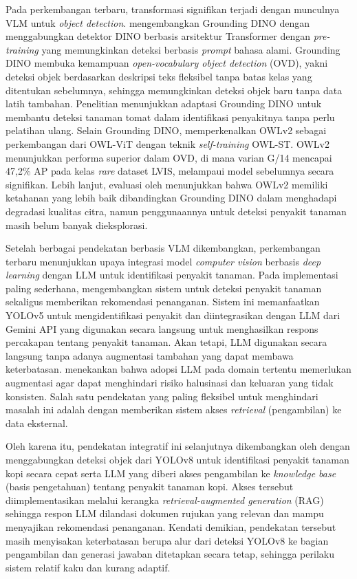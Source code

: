 Pada perkembangan terbaru, transformasi signifikan terjadi dengan munculnya VLM untuk \textit{object detection}. \textcite{liuGroundingDINOMarrying2025} mengembangkan Grounding DINO dengan menggabungkan detektor DINO berbasis arsitektur Transformer dengan \textit{pre-training} yang memungkinkan deteksi berbasis \textit{prompt} bahasa alami. Grounding DINO membuka kemampuan \textit{open-vocabulary object detection} (OVD), yakni deteksi objek berdasarkan deskripsi teks fleksibel tanpa batas kelas yang ditentukan sebelumnya, sehingga memungkinkan deteksi objek baru tanpa data latih tambahan. Penelitian \textcite{kaurVisuallanguageTransformerbasedTomato2025} menunjukkan adaptasi Grounding DINO untuk membantu deteksi tanaman tomat dalam identifikasi penyakitnya tanpa perlu pelatihan ulang. Selain Grounding DINO, \textcite{mindererScalingOpenVocabularyObject2024} memperkenalkan OWLv2 sebagai perkembangan dari OWL-ViT dengan teknik \textit{self-training} OWL-ST. OWLv2 menunjukkan performa superior dalam OVD, di mana varian G/14 mencapai 47,2\% AP pada kelas \textit{rare} dataset LVIS, melampaui model sebelumnya secara signifikan. Lebih lanjut, evaluasi oleh \textcite{wuEvaluatingPerformanceOpenVocabulary2026} menunjukkan bahwa OWLv2 memiliki ketahanan yang lebih baik dibandingkan Grounding DINO dalam menghadapi degradasi kualitas citra, namun penggunaannya untuk deteksi penyakit tanaman masih belum banyak dieksplorasi.

Setelah berbagai pendekatan berbasis VLM dikembangkan, perkembangan terbaru menunjukkan upaya integrasi model \textit{computer vision} berbasis \textit{deep learning} dengan LLM untuk identifikasi penyakit tanaman. Pada implementasi paling sederhana, \textcite{sbDesignImplementationAIPowered2024} mengembangkan sistem untuk deteksi penyakit tanaman sekaligus memberikan rekomendasi penanganan. Sistem ini memanfaatkan YOLOv5 untuk mengidentifikasi penyakit dan diintegrasikan dengan LLM dari Gemini API yang digunakan secara langsung untuk menghasilkan respons percakapan tentang penyakit tanaman. Akan tetapi, LLM digunakan secara langsung tanpa adanya augmentasi tambahan yang dapat membawa keterbatasan. \textcite{minaeeLargeLanguageModels2025} menekankan bahwa adopsi LLM pada domain tertentu memerlukan augmentasi agar dapat menghindari risiko halusinasi dan keluaran yang tidak konsisten. Salah satu pendekatan yang paling fleksibel untuk menghindari masalah ini adalah dengan memberikan sistem akses \textit{retrieval} (pengambilan) ke data eksternal.

Oleh karena itu, pendekatan integratif ini selanjutnya dikembangkan oleh \textcite{mondalVisionMeetsLanguage2025} dengan menggabungkan deteksi objek dari YOLOv8 untuk identifikasi penyakit tanaman kopi secara cepat serta LLM yang diberi akses pengambilan ke \textit{knowledge base} (basis pengetahuan) tentang penyakit tanaman kopi. Akses tersebut diimplementasikan melalui kerangka \textit{retrieval-augmented generation} (RAG) sehingga respon LLM dilandasi dokumen rujukan yang relevan dan mampu menyajikan rekomendasi penanganan. Kendati demikian, pendekatan tersebut masih menyisakan keterbatasan berupa alur dari deteksi YOLOv8 ke bagian pengambilan dan generasi jawaban ditetapkan secara tetap, sehingga perilaku sistem relatif kaku dan kurang adaptif.

